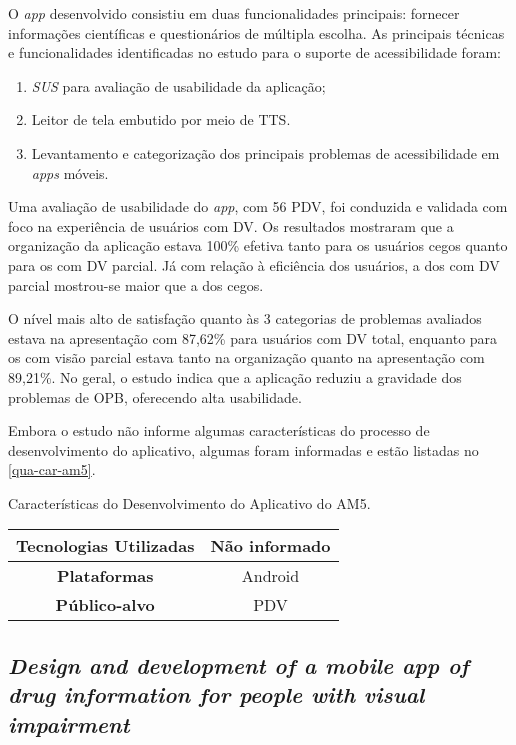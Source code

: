O \emph{app} desenvolvido consistiu em duas funcionalidades principais: fornecer informações científicas e questionários de múltipla escolha.
As principais técnicas e funcionalidades identificadas no estudo para o suporte de acessibilidade foram:

\begin{enumerate}
  \item \emph{SUS} para avaliação de usabilidade da aplicação;
  \item Leitor de tela embutido por meio de TTS\@.
  \item Levantamento e categorização dos principais problemas de acessibilidade em \emph{apps} móveis.
\end{enumerate}

Uma avaliação de usabilidade do \emph{app}, com 56 PDV, foi conduzida e validada com foco na experiência de usuários com DV\@.
Os resultados mostraram que a organização da aplicação estava 100\% efetiva tanto para os usuários cegos quanto para os com DV parcial.
Já com relação à eficiência dos usuários, a dos com DV parcial mostrou-se maior que a dos cegos.

O nível mais alto de satisfação quanto às 3 categorias de problemas avaliados estava na apresentação com
87,62\% para usuários com DV total, enquanto para os com visão parcial estava tanto na organização quanto
na apresentação com 89,21\%.
No geral, o estudo indica que a aplicação reduziu a gravidade dos problemas de OPB, oferecendo alta usabilidade.

Embora o estudo não informe algumas características do processo de desenvolvimento do aplicativo, algumas foram
informadas e estão listadas no \autoref{qua-car-am5}.

\begin{quadro}[htb!]
  \caption{\label{qua-car-am5}Características do Desenvolvimento do Aplicativo do AM5.}
  \begin{tabular}{|c|c|}
    \hline
    \textbf{Tecnologias Utilizadas} & Não informado \\ \hline
    \textbf{Plataformas}            & Android       \\ \hline
    \textbf{Público-alvo}           & PDV           \\
    \hline
  \end{tabular}
\end{quadro}

\subsection{\emph{Design and development of a mobile app of drug information for people with visual impairment}}

